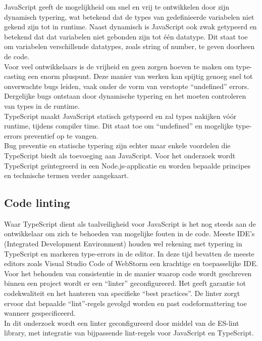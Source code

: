 JavaScript geeft de mogelijkheid om snel en vrij te ontwikkelen door zijn dynamisch typering, wat betekend dat de types van gedefinieerde variabelen niet gekend zijn tot in runtime. Naast dynamisch is JavaScript ook zwak getypeerd en betekend dat dat variabelen niet gebonden zijn tot één datatype. Dit staat toe om variabelen verschillende datatypes, zoals string of number, te geven doorheen de code. \\
Voor veel ontwikkelaars is de vrijheid en geen zorgen hoeven te maken om type-casting een enorm pluspunt. Deze manier van werken kan spijtig genoeg snel tot onverwachte bugs leiden, vaak onder de vorm van verstopte “undefined” errors. Dergelijke bugs ontstaan door dynamische typering en het moeten controleren van types in de runtime. \\
TypeScript maakt JavaScript statisch getypeerd en zal types nakijken vóór runtime, tijdens compiler time. Dit staat toe om “undefined” en mogelijke type-errors preventief op te vangen. \\
Bug preventie en statische typering zijn echter maar enkele voordelen die TypeScript biedt als toevoeging aan JavaScript. Voor het onderzoek wordt TypeScript geïntegreerd in een Node.js-applicatie en worden bepaalde principes en technische termen verder aangekaart.

\subsection{Code linting}

Waar TypeScript dient als taalveiligheid voor JavaScript is het nog steeds aan de ontwikkelaar om zich te behoeden van mogelijke fouten in de code. Meeste IDE's (Integrated Development Environment) houden wel rekening met typering in TypeScript en markeren type-errors in de editor. In deze tijd bevatten de meeste editors zoals Visual Studio Code of WebStorm een krachtige en toepasselijke IDE. \\ 
Voor het behouden van consistentie in de manier waarop code wordt geschreven binnen een project wordt er een “linter” geconfigureerd. Het geeft garantie tot codekwaliteit en het hanteren van specifieke ``best practices''. De linter zorgt ervoor dat bepaalde “lint”-regels gevolgd worden en past codeformattering toe wanneer gespecificeerd. \\
In dit onderzoek wordt een linter geconfigureerd door middel van de ES-lint library, met integratie van bijpassende lint-regels voor JavaScript en TypeScript.


